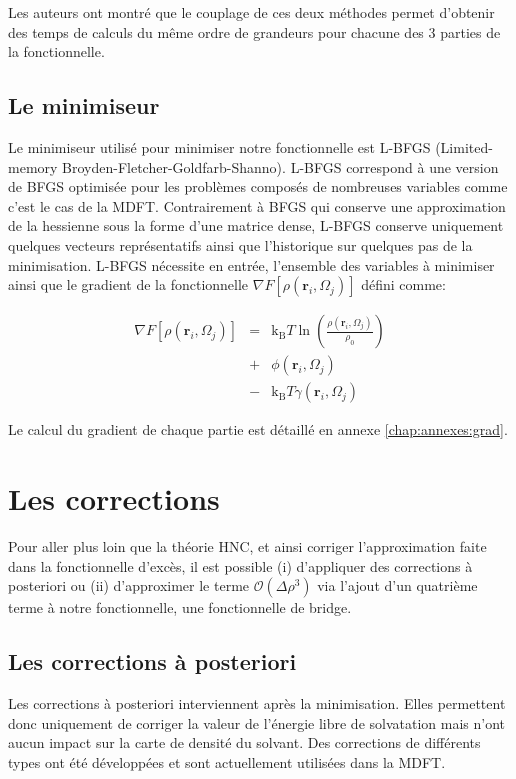 Les auteurs\cite{ding_thesis} ont montré que le couplage de ces deux méthodes permet d'obtenir des temps de calculs du même ordre de grandeurs pour chacune des 3 parties de la fonctionnelle. 


\subsection{Le minimiseur}
Le minimiseur utilisé pour minimiser notre fonctionnelle est L-BFGS (Limited-memory Broyden-Fletcher-Goldfarb-Shanno)\cite{Byrd_lbfgs_1995}. L-BFGS correspond à une version de BFGS\cite{bfgs_2006} optimisée pour les problèmes composés de nombreuses variables comme c'est le cas de la MDFT. Contrairement à BFGS qui conserve une approximation de la hessienne sous la forme d'une matrice dense, L-BFGS conserve uniquement quelques vecteurs représentatifs ainsi que l'historique sur quelques pas de la minimisation. L-BFGS nécessite en entrée, l'ensemble des variables à minimiser ainsi que le gradient de la fonctionnelle $\nabla F[\rho\left(\boldsymbol{r}_i,\Omega_j\right)]$ défini comme:


\begin{eqnarray}
\nabla F[\rho(\boldsymbol{r}_i,\Omega_j)] &=& \mathrm{k_B}T \ln(\frac{\rho(\boldsymbol{r}_i,\Omega_j)}{\rho_0}) \\
&+& \phi(\boldsymbol{r}_i,\Omega_j) \nonumber \\
&-& \mathrm{k_B}T \gamma(\boldsymbol{r}_i,\Omega_j) \nonumber
\end{eqnarray}

Le calcul du gradient de chaque partie est détaillé en annexe \ref{chap:annexes:grad}.

\section{Les corrections}
Pour aller plus loin que la théorie HNC, et ainsi corriger l'approximation faite dans la fonctionnelle d'excès, il est possible (i) d'appliquer des corrections à posteriori ou (ii) d'approximer le terme $\mathcal{O}(\Delta\rho^{3})$ via l'ajout d'un quatrième terme à notre fonctionnelle, une fonctionnelle de bridge.


\subsection{Les corrections à posteriori}
Les corrections à posteriori interviennent après la minimisation. Elles permettent donc uniquement de corriger la valeur de l'énergie libre de solvatation mais n'ont aucun impact sur la carte de densité du solvant. Des corrections de différents types ont été développées et sont actuellement utilisées dans la MDFT.


